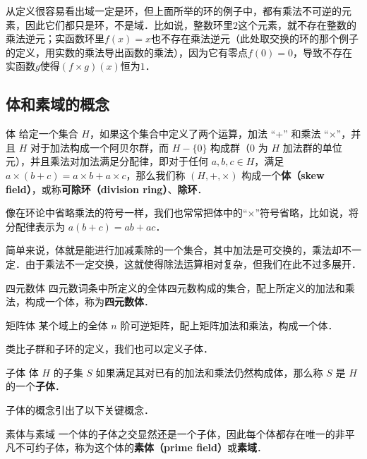 从定义很容易看出域一定是环，但上面所举的环的例子中，都有乘法不可逆的元素，因此它们都只是环，不是域．比如说，整数环里$2$这个元素，就不存在整数的乘法逆元；实函数环里$f(x)=x$也不存在乘法逆元（此处取交换的环的那个例子的定义，用实数的乘法导出函数的乘法），因为它有零点$f(0)=0$，导致不存在实函数$g$使得$(f\times g)(x)$恒为$1$．




\subsection{体和素域的概念}

\begin{definition}{体}
给定一个集合 $H$，如果这个集合中定义了两个运算，加法 “+” 和乘法 “$\times$”，并且 $H$ 对于加法构成一个阿贝尔群，而 $H-\{0\}$ 构成群（$0$ 为 $H$ 加法群的单位元），并且乘法对加法满足分配律，即对于任何 $a, b, c\in H$，满足 $a\times(b+c)=a\times b+a\times c$，那么我们称 $(H, +, \times)$ 构成一个\textbf{体（skew field）}，或称\textbf{可除环（division ring）}、\textbf{除环}．
\end{definition}

像在环论中省略乘法的符号一样，我们也常常把体中的“$\times$”符号省略，比如说，将分配律表示为 $a(b+c)=ab+ac$．

简单来说，体就是能进行加减乘除的一个集合，其中加法是可交换的，乘法却不一定．由于乘法不一定交换，这就使得除法运算相对复杂，但我们在此不过多展开．

\begin{example}{四元数体}
四元数词条中所定义的全体四元数构成的集合，配上所定义的加法和乘法，构成一个体，称为\textbf{四元数体}．
\end{example}

\begin{example}{矩阵体}
某个域上的全体 $n$ 阶可逆矩阵，配上矩阵加法和乘法，构成一个体．
\end{example}

类比子群和子环的定义，我们也可以定义子体．

\begin{definition}{子体}
体 $H$ 的子集 $S$ 如果满足其对已有的加法和乘法仍然构成体，那么称 $S$ 是 $H$ 的一个\textbf{子体}．
\end{definition}
子体的概念引出了以下关键概念．
\begin{definition}{素体与素域}
一个体的子体之交显然还是一个子体，因此每个体都存在唯一的非平凡不可约子体，称为这个体的\textbf{素体（prime field）}或\textbf{素域}．
\end{definition}

